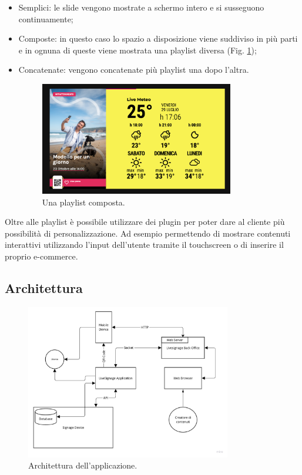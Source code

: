 \begin{itemize}
    \item Semplici: le slide vengono mostrate a schermo intero e si susseguono continuamente;
    \item Composte: in questo caso lo spazio a disposizione viene suddiviso in più parti e in ognuna di queste viene mostrata una playlist diversa (Fig. \ref*{fig:playlist-composta});
    \item Concatenate: vengono concatenate più playlist una dopo l'altra.
    \begin{figure}[!htb]
        \centering
        \includegraphics[width= 0.8\textwidth]{images/Introduzione/playlist-composta.png} 
        \caption{Una playlist composta.} 
        \label{fig:playlist-composta}
    \end{figure}
\end{itemize}


Oltre alle playlist è possibile utilizzare dei plugin per poter dare al cliente più possibilità di personalizzazione. Ad esempio permettendo di  mostrare contenuti interattivi utilizzando l'input dell'utente tramite il touchscreen o di inserire il proprio e-commerce.

\subsection{Architettura}
\begin{figure}[!htb]
    \centering
    \includegraphics[width= 0.8\textwidth]{images/Introduzione/architettura.jpg} 
    \caption{Architettura dell'applicazione.} 
    \label{fig:architettura}
\end{figure}

